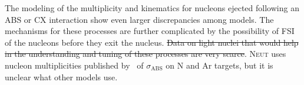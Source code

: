 The modeling of the multiplicity and kinematics for nucleons ejected following an ABS or CX interaction show even larger discrepancies among models. The mechanisms for these processes are further complicated by the possibility of FSI of the nucleons before they exit the nucleus. {\color{red}\st{Data on light nuclei that would help in the understanding and tuning of these processes are very scarce}}. \textsc{Neut} uses nucleon multiplicities published by~\cite{Rowntree} of $\sigma_{\mathrm{ABS}}$ on N and Ar targets, but it is unclear what other models use.
